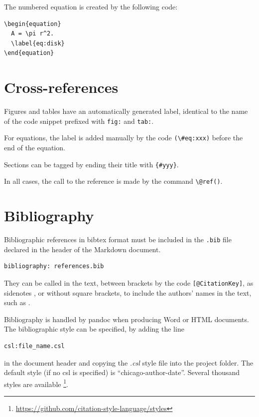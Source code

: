 \documentclass[
  12pt,
  american,
  a4paper,
  extrafontsizes,onecolumn,openright
  ]{memoir}
\begin{document}
The numbered equation is created by the following code:

\begin{verbatim}
\begin{equation}
  A = \pi r^2.
  \label{eq:disk}
\end{equation}
\end{verbatim}

\hypertarget{cross-references}{%
\section{Cross-references}\label{cross-references}}

Figures and tables have an automatically generated label, identical to the name of the code snippet prefixed with \texttt{fig:} and \texttt{tab:}.

For equations, the label is added manually by the code \texttt{(\textbackslash{}\#eq:xxx)} before the end of the equation.

Sections can be tagged by ending their title with \texttt{\{\#yyy\}}.

In all cases, the call to the reference is made by the command \texttt{\textbackslash{}@ref()}.

\hypertarget{bibliography}{%
\section{Bibliography}\label{bibliography}}

Bibliographic references in bibtex format must be included in the \texttt{.bib} file declared in the header of the Markdown document.

\begin{verbatim}
bibliography: references.bib
\end{verbatim}

They can be called in the text, between brackets by the code \texttt{{[}@CitationKey{]}}, as sidenotes \autocite{Xie2016}, or without square brackets, to include the authors' names in the text, such as \textcite{Xie2018} .

Bibliography is handled by pandoc when producing Word or HTML documents.
The bibliographic style can be specified, by adding the line

\begin{verbatim}
csl:file_name.csl
\end{verbatim}

in the document header and copying the \emph{.csl} style file into the project folder.
The default style (if no csl is specified) is \enquote{chicago-author-date}.
Several thousand styles are available \footnote{\url{https://github.com/citation-style-language/styles}}.
\end{document}
